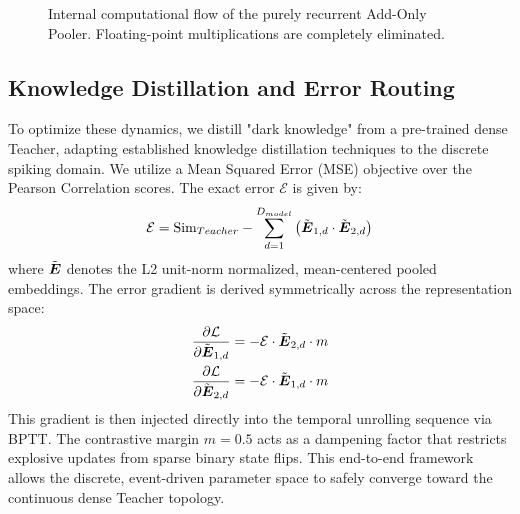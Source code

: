 \documentclass[preprint,12pt]{elsarticle}
\begin{document}
\begin{figure}[t!]
\begin{center}
{%
}
\end{center}
\caption{Internal computational flow of the purely recurrent Add-Only Pooler. Floating-point multiplications are completely eliminated.}
\label{fig:pooler_mech}
\end{figure}


\subsection{Knowledge Distillation and Error Routing}
To optimize these dynamics, we distill "dark knowledge" from a pre-trained dense Teacher, adapting established knowledge distillation techniques \citep{hinton2015distilling} to the discrete spiking domain. We utilize a Mean Squared Error (MSE) objective over the Pearson Correlation scores. The exact error $\mathcal{E}$ is given by:
\begin{equation}
\mathcal{E} = \text{Sim}_{Teacher} - \sum_{d=1}^{D_{model}} \left(\tilde{\boldsymbol{E}}_{1,d} \cdot \tilde{\boldsymbol{E}}_{2,d}\right)
\end{equation}
where $\tilde{\boldsymbol{E}}$ denotes the L2 unit-norm normalized, mean-centered pooled embeddings. The error gradient is derived symmetrically across the representation space:
\begin{align}
\frac{\partial \mathcal{L}}{\partial \tilde{\boldsymbol{E}}_{1,d}} &= -\mathcal{E} \cdot \tilde{\boldsymbol{E}}_{2,d} \cdot m \\
\frac{\partial \mathcal{L}}{\partial \tilde{\boldsymbol{E}}_{2,d}} &= -\mathcal{E} \cdot \tilde{\boldsymbol{E}}_{1,d} \cdot m
\end{align}
This gradient is then injected directly into the temporal unrolling sequence via BPTT. The contrastive margin $m=0.5$ acts as a dampening factor that restricts explosive updates from sparse binary state flips. This end-to-end framework allows the discrete, event-driven parameter space to safely converge toward the continuous dense Teacher topology.
\end{document}
